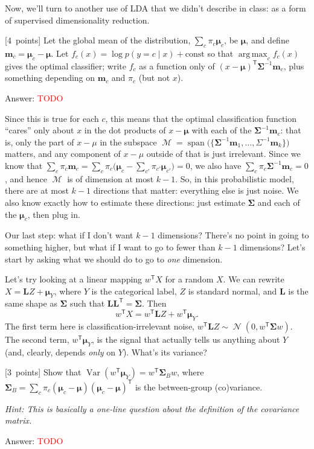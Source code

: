 \documentclass{article}
\newcommand{\ask}[1]{\textcolor{question}{#1}}
\newenvironment{answer}{\par\begingroup\color{answer}Answer: }{\endgroup}
\newcommand{\red}[1]{\textcolor{red}{#1}}
\newcommand{\pts}[1]{\textcolor{points}{[#1~points]}}
\newcommand{\hint}[1]{\textcolor{black!60!white}{\emph{Hint: #1}}}
\newcommand{\TODO}{\red{TODO}}
\DeclareMathOperator*{\argmax}{arg\,max}
\DeclareMathOperator{\Var}{Var}
\newcommand{\bSigma}{\boldsymbol{\Sigma}}
\newcommand{\bmu}{\boldsymbol{\mu}}
\newcommand{\bL}{\mathbf{L}}
\newcommand{\Bm}{\mathbf{m}}
\DeclareMathOperator{\M}{\mathcal{M}}
\DeclareMathOperator{\N}{\mathcal{N}}
\newcommand{\tp}{^\mathsf{T}}
\numberwithin{equation}{section}
\begin{document}
Now, we'll turn to another use of LDA that we didn't describe in class:
as a form of supervised dimensionality reduction.

\begin{qlist}[resume]
\item \pts{4}
Let the global mean of the distribution, $\sum_c \pi_c \bmu_c$, be $\bmu$,
and define $\Bm_c = \bmu_c - \bmu$.
Let $f_c(x) = \log p(y = c \mid x) + \mathrm{const}$
so that $\argmax_c f_c(x)$ gives the optimal classifier;
\ask{write $f_c$ as a function only of
$(x - \bmu)\tp \bSigma^{-1} \Bm_c$, plus something depending on $\Bm_c$ and $\pi_c$ (but not $x$)}.
\begin{answer}\TODO\end{answer}

\end{qlist}
Since this is true for each $c$,
this means that the optimal classification function ``cares'' only about $x$
in the dot products of $x - \bmu$ with each of the $\bSigma^{-1} \Bm_c$:
that is, only the part of $x-\mu$ in the subspace
$\M = \operatorname{span}\bigl( \{ \bSigma^{-1} \Bm_1, \dots, \Sigma^{-1} \Bm_k \} \bigr)$ matters,
and any component of $x - \mu$ outside of that is just irrelevant.
Since we know that $\sum_c \pi_c \Bm_c = \sum_c \pi_c \bigl(\bmu_c - \sum_{c'} \pi_{c'} \bmu_{c'}\bigr) = 0$,
we also have $\sum_c \pi_c \bSigma^{-1} \Bm_c = 0$,
and hence $\M$ is of dimension at most $k-1$.
So, in this probabilistic model,
there are at most $k-1$ directions that matter:
everything else is just noise.
We also know exactly how to estimate these directions:
just estimate $\bSigma$ and each of the $\bmu_c$,
then plug in.

Our last step: what if I don't want $k-1$ dimensions?
There's no point in going to something higher,
but what if I want to go to fewer than $k-1$ dimensions?
Let's start by asking what we should do to go to \emph{one} dimension.

Let's try looking at a linear mapping $w\tp X$ for a random $X$.
We can rewrite
$X = \bL Z + \bmu_Y$,
where $Y$ is the categorical label,
$Z$ is standard normal,
and $\bL$ is the same shape as $\bSigma$ such that $\bL \bL\tp = \bSigma$.
Then
\[
    w\tp X = w\tp \bL Z + w\tp \bmu_Y
.\]
The first term here is classification-irrelevant noise,
$w\tp \bL Z \sim \N(0, w\tp \bSigma w)$.
The second term, $w\tp \bmu_Y$, is the signal that actually tells us anything about $Y$
(and, clearly, depends \emph{only} on $Y$).
What's its variance?
\begin{qlist}[resume]
\item \pts{3}
Show that $\Var(w\tp \bmu_Y) = w\tp \bSigma_B w$,
where $\bSigma_B = \sum_c \pi_c (\bmu_c - \bmu) (\bmu_c - \bmu)\tp$
is the between-group (co)variance.

\hint{This is basically a one-line question about the definition of the covariance matrix.}
\begin{answer}\TODO\end{answer}
\end{qlist}
\end{document}

